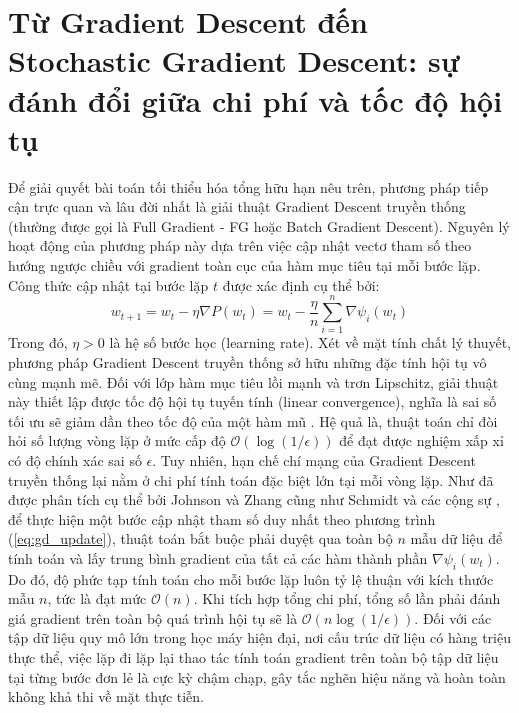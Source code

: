 \section{Từ Gradient Descent đến Stochastic Gradient Descent: sự đánh đổi giữa chi phí và tốc độ hội tụ}

Để giải quyết bài toán tối thiểu hóa tổng hữu hạn nêu trên, phương pháp tiếp cận trực quan và lâu đời nhất là giải thuật Gradient Descent truyền thống (thường được gọi là Full Gradient - FG hoặc Batch Gradient Descent). Nguyên lý hoạt động của phương pháp này dựa trên việc cập nhật vectơ tham số theo hướng ngược chiều với gradient toàn cục của hàm mục tiêu tại mỗi bước lặp. Công thức cập nhật tại bước lặp $t$ được xác định cụ thể bởi:
\begin{equation}\label{eq:gd_update}
w_{t+1} = w_t - \eta \nabla P(w_t) = w_t - \frac{\eta}{n} \sum_{i=1}^{n} \nabla \psi_i(w_t)
\end{equation}
Trong đó, $\eta > 0$ là hệ số bước học (learning rate). Xét về mặt tính chất lý thuyết, phương pháp Gradient Descent truyền thống sở hữu những đặc tính hội tụ vô cùng mạnh mẽ. Đối với lớp hàm mục tiêu lồi mạnh và trơn Lipschitz, giải thuật này thiết lập được tốc độ hội tụ tuyến tính (linear convergence), nghĩa là sai số tối ưu sẽ giảm dần theo tốc độ của một hàm mũ \cite{boyd2004convex}. Hệ quả là, thuật toán chỉ đòi hỏi số lượng vòng lặp ở mức cấp độ $\mathcal{O}(\log(1/\epsilon))$ để đạt được nghiệm xấp xỉ có độ chính xác sai số $\epsilon$. Tuy nhiên, hạn chế chí mạng của Gradient Descent truyền thống lại nằm ở chi phí tính toán đặc biệt lớn tại mỗi vòng lặp. Như đã được phân tích cụ thể bởi Johnson và Zhang \cite{johnson2013accelerating} cũng như Schmidt và các cộng sự \cite{schmidt2017minimizing}, để thực hiện một bước cập nhật tham số duy nhất theo phương trình (\ref{eq:gd_update}), thuật toán bắt buộc phải duyệt qua toàn bộ $n$ mẫu dữ liệu để tính toán và lấy trung bình gradient của tất cả các hàm thành phần $\nabla \psi_i(w_t)$. Do đó, độ phức tạp tính toán cho mỗi bước lặp luôn tỷ lệ thuận với kích thước mẫu $n$, tức là đạt mức $\mathcal{O}(n)$. Khi tích hợp tổng chi phí, tổng số lần phải đánh giá gradient trên toàn bộ quá trình hội tụ sẽ là $\mathcal{O}(n \log(1/\epsilon))$. Đối với các tập dữ liệu quy mô lớn trong học máy hiện đại, nơi cấu trúc dữ liệu có hàng triệu thực thể, việc lặp đi lặp lại thao tác tính toán gradient trên toàn bộ tập dữ liệu tại từng bước đơn lẻ là cực kỳ chậm chạp, gây tắc nghẽn hiệu năng và hoàn toàn không khả thi về mặt thực tiễn.

